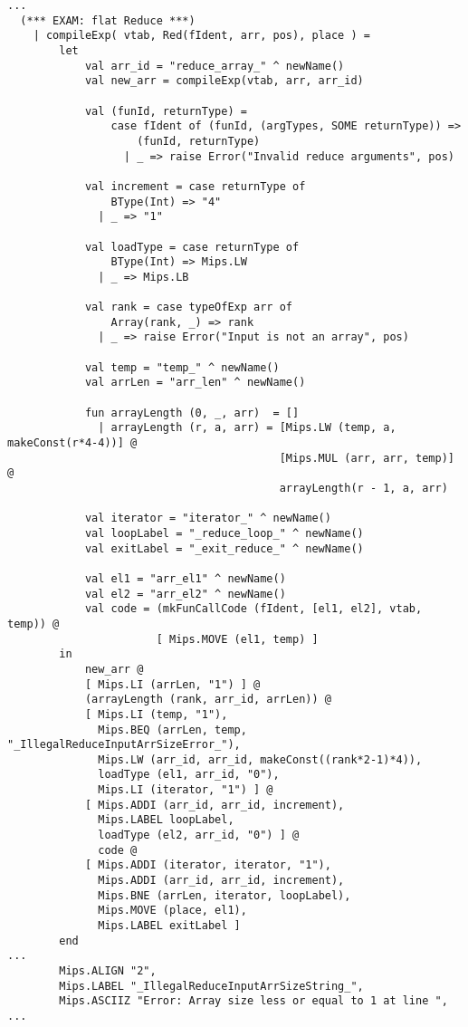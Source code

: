 \documentclass[12pt]{article}
\begin{document}
\begin{lstlisting}
...
  (*** EXAM: flat Reduce ***)
    | compileExp( vtab, Red(fIdent, arr, pos), place ) =
        let 
            val arr_id = "reduce_array_" ^ newName()
            val new_arr = compileExp(vtab, arr, arr_id)

            val (funId, returnType) =
                case fIdent of (funId, (argTypes, SOME returnType)) =>
                    (funId, returnType)
                  | _ => raise Error("Invalid reduce arguments", pos)

            val increment = case returnType of 
                BType(Int) => "4"
              | _ => "1"

            val loadType = case returnType of 
                BType(Int) => Mips.LW
              | _ => Mips.LB
            
            val rank = case typeOfExp arr of 
                Array(rank, _) => rank
              | _ => raise Error("Input is not an array", pos)

            val temp = "temp_" ^ newName()
            val arrLen = "arr_len" ^ newName()

            fun arrayLength (0, _, arr)  = []
              | arrayLength (r, a, arr) = [Mips.LW (temp, a, makeConst(r*4-4))] @
                                          [Mips.MUL (arr, arr, temp)] @
                                          arrayLength(r - 1, a, arr)

            val iterator = "iterator_" ^ newName()
            val loopLabel = "_reduce_loop_" ^ newName()
            val exitLabel = "_exit_reduce_" ^ newName()

            val el1 = "arr_el1" ^ newName()
            val el2 = "arr_el2" ^ newName()
            val code = (mkFunCallCode (fIdent, [el1, el2], vtab, temp)) @
                       [ Mips.MOVE (el1, temp) ]
        in
            new_arr @
            [ Mips.LI (arrLen, "1") ] @
            (arrayLength (rank, arr_id, arrLen)) @
            [ Mips.LI (temp, "1"),
              Mips.BEQ (arrLen, temp, "_IllegalReduceInputArrSizeError_"),
              Mips.LW (arr_id, arr_id, makeConst((rank*2-1)*4)),
              loadType (el1, arr_id, "0"),
              Mips.LI (iterator, "1") ] @
            [ Mips.ADDI (arr_id, arr_id, increment),
              Mips.LABEL loopLabel,
              loadType (el2, arr_id, "0") ] @
              code @
            [ Mips.ADDI (iterator, iterator, "1"),
              Mips.ADDI (arr_id, arr_id, increment),
              Mips.BNE (arrLen, iterator, loopLabel),
              Mips.MOVE (place, el1),
              Mips.LABEL exitLabel ]
        end
...
        Mips.ALIGN "2",
        Mips.LABEL "_IllegalReduceInputArrSizeString_",
        Mips.ASCIIZ "Error: Array size less or equal to 1 at line ",
...
\end{lstlisting}
\end{document}
